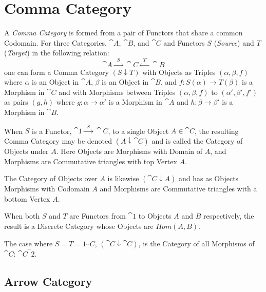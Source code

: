 \section{Comma Category}\label{sec:comma_category}

A \emph{Comma Category} is formed from a pair of Functors that share a
common Codomain. For three Categories, $\cat{A}$, $\cat{B}$, and
$\cat{C}$ and Functors $S$ (\emph{Source}) and $T$ (\emph{Target}) in
the following relation:
\[
  \cat{A} \xrightarrow{\;\; S\;\;} \cat{C} \xleftarrow{\;\;
    T\;\;} \cat{B}
\]
one can form a Comma Category $(S \downarrow T)$ with Objects as
Triples $(\alpha, \beta, f)$ where $\alpha$ is an Object in
$\cat{A}$, $\beta$ is an Object in $\cat{B}$, and $f : S(\alpha)
\rightarrow T(\beta)$ is a Morphism in $\cat{C}$ and with Morphisms
between Triples $(\alpha, \beta, f)$ to $(\alpha', \beta', f')$ as
pairs $(g,h)$ where $g : \alpha \rightarrow \alpha'$ is a Morphism in
$\cat{A}$ and $h : \beta \rightarrow \beta'$ is a Morphism in
$\cat{B}$.

When $S$ is a Functor, $\cat{1} \xrightarrow{\;\;S\;\;}
\cat{C}$, to a single Object $A \in \cat{C}$, the resulting
Comma Category may be denoted $(A \downarrow \cat{C})$ and is
called the Category of Objects under $A$. Here Objects are Morphisms
with Domain of $A$, and Morphisms are Commutative triangles with top
Vertex $A$.

The Category of Objects over $A$ is likewise $(\cat{C} \downarrow
A)$ and has as Objects Morphisms with Codomain $A$ and Morphisms are
Commutative triangles with a bottom Vertex $A$.

When both $S$ and $T$ are Functors from $\cat{1}$ to Objects $A$
and $B$ respectively, the result is a Discrete Category whose Objects
are $Hom(A,B)$.

The case where $S = T = 1_\cat{C}$, $(\cat{C} \downarrow
\cat{C})$, is the Category of all Morphisms of $\cat{C}$:
$\cat{C}^\cat{2}$.



\subsection{Arrow Category}\label{sec:arrow_category}

